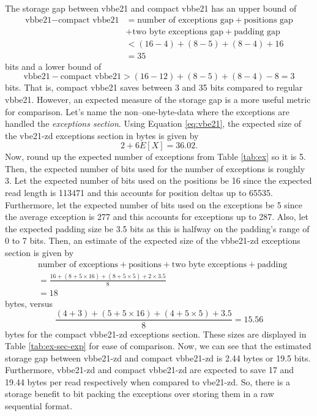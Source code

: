 


The storage gap between vbbe21 and compact vbbe21 has an upper bound of
\begin{align*}
	\text{vbbe21} - \text{compact vbbe21} &= \text{number of exceptions gap}
	+ \text{positions gap}\\ &+\text{two byte exceptions gap} + \text{padding gap}\\
	&< (16-4) + (8-5) + (8-4) + 16\\
	&= 35
\end{align*}
bits
and a lower bound of
\[ \text{vbbe21} - \text{compact vbbe21} > (16-12) + (8-5) + (8-4) - 8 = 3 \]
bits.
That is, compact vbbe21 saves between 3 and 35 bits compared to regular vbbe21.
However, an expected measure of the storage gap is a more useful metric for
comparison. Let's name the non--one-byte-data where the exceptions are handled
the \textit{exceptions section}. Using Equation \ref{eq:vbe21}, the expected size of
the vbe21-zd exceptions section in bytes is given by
\[ 2 + 6E[X] = 36.02. \]
Now, round up the expected number of exceptions from Table \ref{tab:ex} so it is
5. Then, the expected number of bits used for the number of exceptions is roughly
3. Let the expected number of bits used on the positions be 16 since the expected
read length is \num{113471} and this accounts for position deltas up to
\num{65535}. Furthermore, let the expected number of bits used on the
exceptions be 5 since the average exception is 277 and this accounts for
exceptions up to 287. Also, let the expected padding size be 3.5 bits as this is
halfway on the padding's range of 0 to 7 bits.
Then, an estimate of the expected size of the vbbe21-zd exceptions section is
given by
\begin{align*}
	&\text{number of exceptions} + \text{positions} + \text{two byte exceptions} + \text{padding}\\
	&= \frac{16 + (8+5\times16) + (8+5\times 5) + 2\times3.5}{8}\\
	&= 18
\end{align*}
bytes, versus
\[ \frac{(4+3) + (5+5\times16) + (4+5\times 5) + 3.5}{8}= 15.56 \]
bytes
for the compact vbbe21-zd exceptions section. These sizes are displayed in Table
\ref{tab:ex-sec-exp}
for ease of comparison. Now, we can see that the estimated storage gap between
vbbe21-zd and compact vbbe21-zd is 2.44 bytes or 19.5 bits. Furthermore,
vbbe21-zd and compact vbbe21-zd are expected to save 17 and 19.44 bytes
per read respectively when compared to vbe21-zd. So, there is a storage benefit
to bit packing the exceptions over storing them in a raw sequential format.

